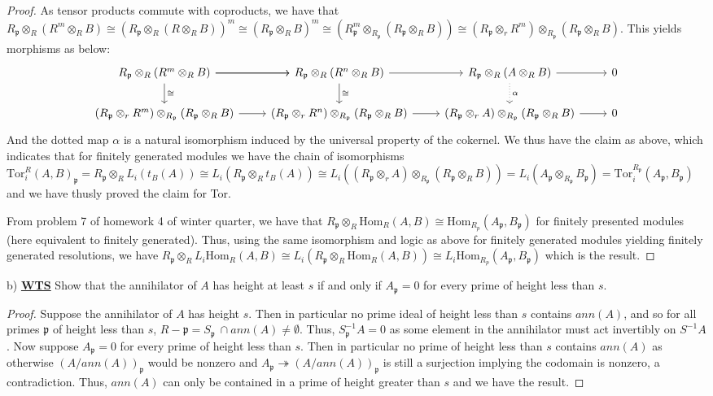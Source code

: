 \documentclass{article}
\newcommand{\Hom}{\text{Hom}}
\newcommand{\fk}[1]{\mathfrak{#1}}
\newcommand{\iso}{\cong}
\newcommand{\onto}{\twoheadrightarrow}
\begin{document}
\begin{proof}
As tensor products commute with coproducts, we have that $R_{\fk{p}} \otimes_{R} ( R^{m} \otimes_{R}B) \iso (R_{\fk{p}} \otimes_{R} ( R \otimes_{R}B))^{m} \iso (R_{\fk{p}} \otimes_{R} B)^{m} \iso (R_{\fk{p}}^{m} \otimes_{R_{\fk{p}}} (R_{\fk{p}} \otimes_{R} B)) \iso (R_{\fk{p}} \otimes_{r}R^{m}) \otimes_{R_{\fk{p}}} (R_{\fk{p}} \otimes_{R} B)$. This yields morphisms as below:
\[
  \begin{tikzcd}
 R_{\fk{p}} \otimes_{R} ( R^{m} \otimes_{R}B) \arrow[r] \arrow[r] \arrow[d, "\iso"]     &  R_{\fk{p}} \otimes_{R} ( R^{n} \otimes_{R}B) \arrow[r] \arrow[d, "\iso"]               &  R_{\fk{p}} \otimes_{R} ( A \otimes_{R}B) \arrow[r] \arrow[d, "\alpha", dotted]     & 0 \\
(R_{\fk{p}} \otimes_{r}R^{m}) \otimes_{R_{\fk{p}}} (R_{\fk{p}} \otimes_{R} B) \arrow[r] & (R_{\fk{p}} \otimes_{r}R^{n}) \otimes_{R_{\fk{p}}} (R_{\fk{p}} \otimes_{R} B) \arrow[r] & (R_{\fk{p}} \otimes_{r}A) \otimes_{R_{\fk{p}}} (R_{\fk{p}} \otimes_{R} B) \arrow[r] & 0
\end{tikzcd}
\]
And the dotted map $\alpha$ is a natural isomorphism induced by the universal property of the cokernel. We thus have the claim as above, which indicates that for finitely generated modules we have the chain of isomorphisms $\text{Tor}_{i}^{R}(A,B)_{\fk{p}} = R_{\fk{p}}\otimes_{R}L_{i}(t_{B}(A)) \iso L_{i}(R_{\fk{p}}\otimes_{R}t_{B}(A)) \iso L_{i}((R_{\fk{p}} \otimes_{r}A) \otimes_{R_{\fk{p}}} (R_{\fk{p}} \otimes_{R} B)) = L_{i}(A_{\fk{p}} \otimes_{R_{\fk{p}}} B_{\fk{p}}) = \text{Tor}_{i}^{R_{\fk{p}}}(A_{\fk{p}},B_{\fk{p}})$ and we have thusly proved the claim for Tor.

From problem 7 of homework 4 of winter quarter, we have that $R_{\fk{p}}\otimes_{R}\Hom_{R}(A,B) \iso \Hom_{R_{p}}(A_{\fk{p}},B_{\fk{p}})$ for finitely presented modules (here equivalent to finitely generated). Thus, using the same isomorphism and logic as above for finitely generated modules yielding finitely generated resolutions, we have $R_{\fk{p}} \otimes_{R}L_{i}\Hom_{R}(A,B) \iso L_{i}(R_{\fk{p}} \otimes_{R} \Hom_{R}(A,B)) \iso L_{i}\Hom_{R_{p}}(A_{\fk{p}},B_{\fk{p}})$ which is the result.
\end{proof}

b) \textbf{\underline{WTS}} Show that the annihilator of $A$ has height at least $s$ if and only if $A_{\fk{p}} = 0$ for every prime of height less than $s$.
\begin{proof}
  Suppose the annihilator of $A$ has height $s$. Then in particular no prime ideal of height less than $s$ contains $ann(A)$, and so for all primes $\fk{p}$ of height less than $s$, $R - \fk{p} = S_{\fk{p}} \ \cap ann(A) \neq \emptyset $. Thus, $S_{\fk{p}}^{-1}A = 0$ as some element in the annihilator must act invertibly on $S^{-1}A$. Now suppose $A_{\fk{p}} = 0$ for every prime of height less than $s$. Then in particular no prime of height less than $s$ contains $ann(A)$ as otherwise $(A/ann(A))_{\fk{p}}$ would be nonzero and $A_{\fk{p}} \onto (A/ann(A))_{\fk{p}}$ is still a surjection implying the codomain is nonzero, a contradiction. Thus, $ann(A)$ can only be contained in a prime of height greater than $s$ and we have the result.
\end{proof}
\end{document}
